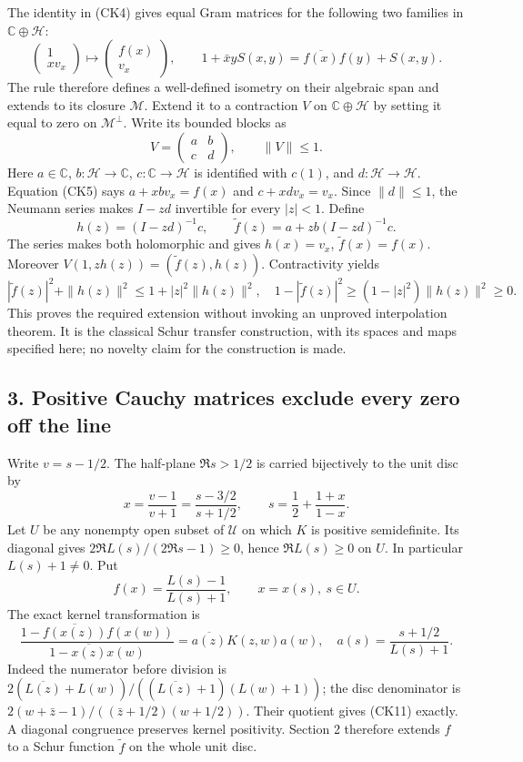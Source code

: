 \documentclass[
  10pt,
  a4paper,
]{article}
\newcounter{none} %
\begin{document}
The identity in (CK4) gives equal Gram matrices for the following two
families in \(\mathbb C\oplus\mathcal H\): \[
\begin{pmatrix}1\\xv_x\end{pmatrix}
\longmapsto
\begin{pmatrix}f(x)\\v_x\end{pmatrix},
\qquad
1+\bar x yS(x,y)=\overline{f(x)}f(y)+S(x,y).
\tag{CK5}
\] The rule therefore defines a well-defined isometry on their algebraic
span and extends to its closure \(\mathcal M\). Extend it to a
contraction \(V\) on \(\mathbb C\oplus\mathcal H\) by setting it equal
to zero on \(\mathcal M^\perp\). Write its bounded blocks as \[
V=\begin{pmatrix}a&b\\c&d\end{pmatrix},\qquad \|V\|\le1.
\tag{CK6}
\] Here \(a\in\mathbb C\), \(b:\mathcal H\to\mathbb C\),
\(c:\mathbb C\to\mathcal H\) is identified with \(c(1)\), and
\(d:\mathcal H\to\mathcal H\). Equation (CK5) says \(a+xbv_x=f(x)\) and
\(c+xdv_x=v_x\). Since \(\|d\|\le1\), the Neumann series makes \(I-zd\)
invertible for every \(|z|<1\). Define \[
h(z)=(I-zd)^{-1}c,\qquad
\widetilde f(z)=a+zb(I-zd)^{-1}c.
\tag{CK7}
\] The series makes both holomorphic and gives \(h(x)=v_x\),
\(\widetilde f(x)=f(x)\). Moreover
\(V(1,zh(z))=(\widetilde f(z),h(z))\). Contractivity yields \[
|\widetilde f(z)|^2+\|h(z)\|^2
\le1+|z|^2\|h(z)\|^2,
\quad
1-|\widetilde f(z)|^2\ge(1-|z|^2)\|h(z)\|^2\ge0.
\tag{CK8}
\] This proves the required extension without invoking an unproved
interpolation theorem. It is the classical Schur transfer construction,
with its spaces and maps specified here; no novelty claim for the
construction is made.

\subsection{3. Positive Cauchy matrices exclude every zero off the
line}\label{positive-cauchy-matrices-exclude-every-zero-off-the-line}

Write \(v=s-1/2\). The half-plane \(\Re s>1/2\) is carried bijectively
to the unit disc by \[
x=\frac{v-1}{v+1}=\frac{s-3/2}{s+1/2},\qquad
s=\frac12+\frac{1+x}{1-x}.
\tag{CK9}
\] Let \(U\) be any nonempty open subset of \(\mathcal U\) on which
\(K\) is positive semidefinite. Its diagonal gives
\(2\Re L(s)/(2\Re s-1)\ge0\), hence \(\Re L(s)\ge0\) on \(U\). In
particular \(L(s)+1\ne0\). Put \[
f(x)=\frac{L(s)-1}{L(s)+1},\qquad x=x(s),\ s\in U.
\tag{CK10}
\] The exact kernel transformation is \[
\frac{1-\overline{f(x(z))}f(x(w))}{1-\overline{x(z)}x(w)}
=\overline{a(z)}K(z,w)a(w),\quad
a(s)=\frac{s+1/2}{L(s)+1}.
\tag{CK11}
\] Indeed the numerator before division is
\(2(\overline{L(z)}+L(w))/((\overline{L(z)}+1)(L(w)+1))\); the disc
denominator is \(2(w+\bar z-1)/((\bar z+1/2)(w+1/2))\). Their quotient
gives (CK11) exactly. A diagonal congruence preserves kernel positivity.
Section 2 therefore extends \(f\) to a Schur function \(\widetilde f\)
on the whole unit disc.
\end{document}
